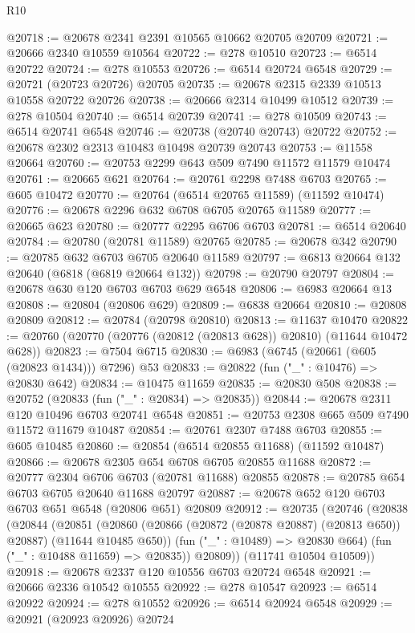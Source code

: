 \begin{lexlean}{R10}
\begin{coremodule}
{{{{{{{{{{{{{{{{{{{{{{{{{{{{{{{{{{{{{{{{{{{{{{{{{{{{{{{{{{{{{{{{{{{{{{{{{{{{{{{{{{{{@20718 := @20678 @2341 @2391 @10565 @10662 @20705 @20709
@20721 := @20666 @2340 @10559 @10564
@20722 := @278 @10510
@20723 := @6514 @20722
@20724 := @278 @10553
@20726 := @6514 @20724 @6548
@20729 := @20721 (@20723 @20726) @20705
@20735 := @20678 @2315 @2339 @10513 @10558 @20722 @20726
@20738 := @20666 @2314 @10499 @10512
@20739 := @278 @10504
@20740 := @6514 @20739
@20741 := @278 @10509
@20743 := @6514 @20741 @6548
@20746 := @20738 (@20740 @20743) @20722
@20752 := @20678 @2302 @2313 @10483 @10498 @20739 @20743
@20753 := @11558 @20664
@20760 := @20753 @2299 @643 @509 @7490 @11572 @11579 @10474
@20761 := @20665 @621
@20764 := @20761 @2298 @7488 @6703
@20765 := @605 @10472
@20770 := @20764 (@6514 @20765 @11589) (@11592 @10474)
@20776 := @20678 @2296 @632 @6708 @6705 @20765 @11589
@20777 := @20665 @623
@20780 := @20777 @2295 @6706 @6703
@20781 := @6514 @20640
@20784 := @20780 (@20781 @11589) @20765
@20785 := @20678 @342
@20790 := @20785 @632 @6703 @6705 @20640 @11589
@20797 := @6813 @20664 @132 @20640 (@6818 (@6819 @20664 @132))
@20798 := @20790 @20797
@20804 := @20678 @630 @120 @6703 @6703 @629 @6548
@20806 := @6983 @20664 @13
@20808 := @20804 (@20806 @629)
@20809 := @6838 @20664
@20810 := @20808 @20809
@20812 := @20784 (@20798 @20810)
@20813 := @11637 @10470
@20822 := @20760 (@20770 (@20776 (@20812 (@20813 @628)) @20810) (@11644 @10472 @628))
@20823 := @7504 @6715
@20830 := @6983 (@6745 (@20661 (@605 (@20823 @1434))) @7296) @53
@20833 := @20822 (fun ("_" : @10476) => @20830 @642)
@20834 := @10475 @11659
@20835 := @20830 @508
@20838 := @20752 (@20833 (fun ("_" : @20834) => @20835))
@20844 := @20678 @2311 @120 @10496 @6703 @20741 @6548
@20851 := @20753 @2308 @665 @509 @7490 @11572 @11679 @10487
@20854 := @20761 @2307 @7488 @6703
@20855 := @605 @10485
@20860 := @20854 (@6514 @20855 @11688) (@11592 @10487)
@20866 := @20678 @2305 @654 @6708 @6705 @20855 @11688
@20872 := @20777 @2304 @6706 @6703 (@20781 @11688) @20855
@20878 := @20785 @654 @6703 @6705 @20640 @11688 @20797
@20887 := @20678 @652 @120 @6703 @6703 @651 @6548 (@20806 @651) @20809
@20912 := @20735
    (@20746
      (@20838
        (@20844
          (@20851
            (@20860 (@20866 (@20872 (@20878 @20887) (@20813 @650)) @20887) (@11644 @10485 @650))
            (fun ("_" : @10489) => @20830 @664)
            (fun ("_" : @10488 @11659) => @20835))
          @20809))
      (@11741 @10504 @10509))
@20918 := @20678 @2337 @120 @10556 @6703 @20724 @6548
@20921 := @20666 @2336 @10542 @10555
@20922 := @278 @10547
@20923 := @6514 @20922
@20924 := @278 @10552
@20926 := @6514 @20924 @6548
@20929 := @20921 (@20923 @20926) @20724
}}}}}}}}}}}}}}}}}}}}}}}}}}}}}}}}}}}}}}}}}}}}}}}}}}}}}}}}}}}}}}}}}}}}}}}}}}}}}}}}}}}}
\end{coremodule}
\end{lexlean}
